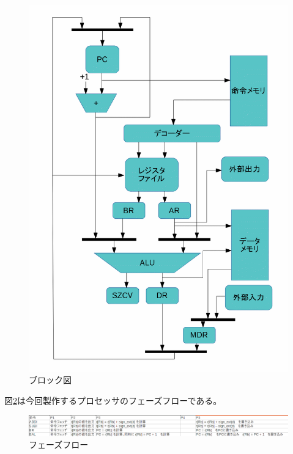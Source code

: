 \documentclass{jsreport}
\begin{document}
\begin{figure}[h]
\centering
\includegraphics[width=120mm]{figures/data_flow.png}
\caption{ブロック図}
\label{fig:block}
\end{figure}

図\ref{fig:phase}は今回製作するプロセッサのフェーズフローである。

\begin{figure}[h]
\centering
\includegraphics[width=180mm]{figures/phase.png}
\caption{フェーズフロー}
\label{fig:phase}
\end{figure}
\end{document}
